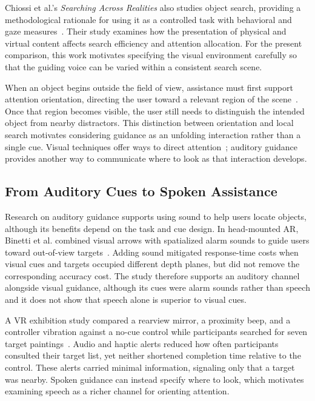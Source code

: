 Chiossi et al.'s \emph{Searching Across Realities} also studies object search, providing a methodological rationale for using it as a controlled task with behavioral and gaze measures~\cite{chiossi2024searching}. Their study examines how the presentation of physical and virtual content affects search efficiency and attention allocation. For the present comparison, this work motivates specifying the visual environment carefully so that the guiding voice can be varied within a consistent search scene.

When an object begins outside the field of view, assistance must first support attention orientation, directing the user toward a relevant region of the scene~\cite{sabouni2025guidance}. Once that region becomes visible, the user still needs to distinguish the intended object from nearby distractors. This distinction between orientation and local search motivates considering guidance as an unfolding interaction rather than a single cue. Visual techniques offer ways to direct attention~\cite{grogorick2017subtle,lange2020hivefive}; auditory guidance provides another way to communicate where to look as that interaction develops.

\subsection{From Auditory Cues to Spoken Assistance}
Research on auditory guidance supports using sound to help users locate objects, although its benefits depend on the task and cue design. In head-mounted AR, Binetti et al. combined visual arrows with spatialized alarm sounds to guide users toward out-of-view targets~\cite{binetti2021outofview}. Adding sound mitigated response-time costs when visual cues and targets occupied different depth planes, but did not remove the corresponding accuracy cost. The study therefore supports an auditory channel alongside visual guidance, although its cues were alarm sounds rather than speech and it does not show that speech alone is superior to visual cues.

A VR exhibition study compared a rearview mirror, a proximity beep, and a controller vibration against a no-cue control while participants searched for seven target paintings~\cite{sabouni2025guidance}. Audio and haptic alerts reduced how often participants consulted their target list, yet neither shortened completion time relative to the control. These alerts carried minimal information, signaling only that a target was nearby. Spoken guidance can instead specify where to look, which motivates examining speech as a richer channel for orienting attention.

